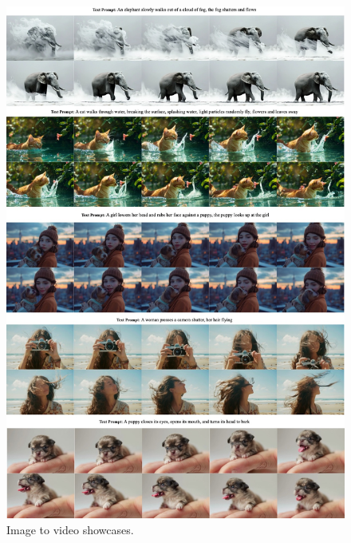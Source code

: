 \begin{figure}[ht]
\begin{center}
\includegraphics[width=\linewidth]{images/t2v/i2vgood2.jpg}
\end{center}
\caption{Image to video showcases.}
\label{fig:i2vgood2}
\end{figure}